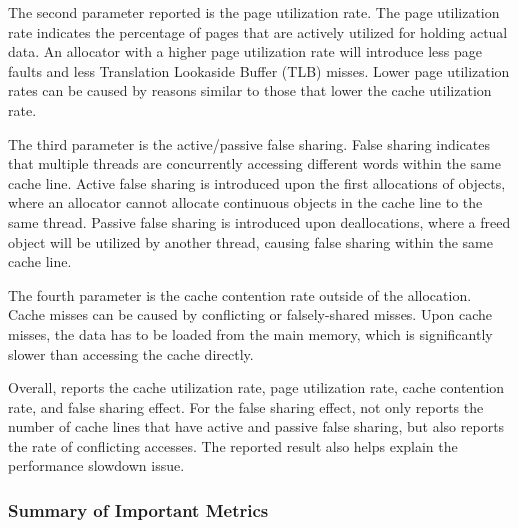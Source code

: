 
The second parameter reported is the page utilization rate. The page utilization rate indicates the percentage of pages that are actively utilized for holding actual data. An allocator with a higher page utilization rate will introduce less page faults and less Translation Lookaside Buffer (TLB) misses. Lower page utilization rates can be caused by reasons similar to those that lower the cache utilization rate.  

The third parameter is the active/passive false sharing. False sharing indicates that multiple threads are concurrently accessing different words within the same cache line. Active false sharing is introduced upon the first allocations of objects, where an allocator cannot allocate continuous objects in the cache line to the same thread. Passive false sharing is introduced upon deallocations, where a freed object will be utilized by another thread, causing false sharing within the same cache line. 

The fourth parameter is the cache contention rate outside of the allocation. Cache misses can be caused by conflicting or falsely-shared misses. Upon cache misses, the data has to be loaded from the main memory, which is significantly slower than accessing the cache directly. 

Overall, \MP{} reports the cache utilization rate, page utilization rate, cache contention rate, and false sharing effect. For the false sharing effect, \MP{} not only reports the number of cache lines that have active and passive false sharing, but also reports the rate of conflicting accesses. The reported result also helps explain the performance slowdown issue. 

\subsubsection{Summary of Important Metrics}

